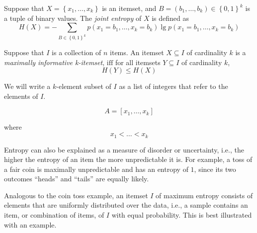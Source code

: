 \begin{definition}
    Suppose that $X = \left\{ x_{1}, \dots, x_{k} \right\}$ is an itemset, and $B = \left( b_{1}, \dots, b_{k} \right) \in \left\{ 0, 1 \right\}^{k}$ is a tuple of binary values. The \emph{joint entropy} of $X$ is defined as
    \begin{equation*}
        H(X) = -\sum_{B \in \left\{ 0, 1 \right\}^{k}} p \left( x_{1} = b_{1}, \dots, x_{k} = b_{k} \right) \lg p \left( x_{1} = b_{1}, \dots, x_{k} = b_{k} \right)
    \end{equation*}
    \label{def:joint_entropy}
\end{definition}

\begin{definition}
    Suppose that $I$ is a collection of $n$ items. An itemset $X \subseteq I$ of cardinality $k$ is a \emph{maximally informative k-itemset}, $\mathrm{iff}$ for all itemsets $Y \subseteq I$ of cardinality $k$,
    \begin{equation}
        H(Y) \leq H(X)
    \end{equation}
    \label{def:miki}
\end{definition}

We will write a $k$-element subset of $I$ as a list of integers that refer to the elements of $I$.

\begin{equation*}
    A = \left[ x_{1}, \dots, x_{k} \right]
\end{equation*}

\noindent where
\begin{equation*}
    x_{1} < \dots < x_{k}
\end{equation*}

Entropy can also be explained as a measure of disorder or uncertainty, i.e., the higher the entropy of an item the more unpredictable it is.
For example, a toss of a fair coin is maximally unpredictable and has an entropy of $1$, since its two outcomes ``heads'' and ``tails'' are equally likely.

Analogous to the coin toss example, an itemset $I$ of maximum entropy consists of elements that are uniformly distributed over the data, i.e., a sample contains an item, or combination of items, of $I$ with equal probability.
This is best illustrated with an example.

